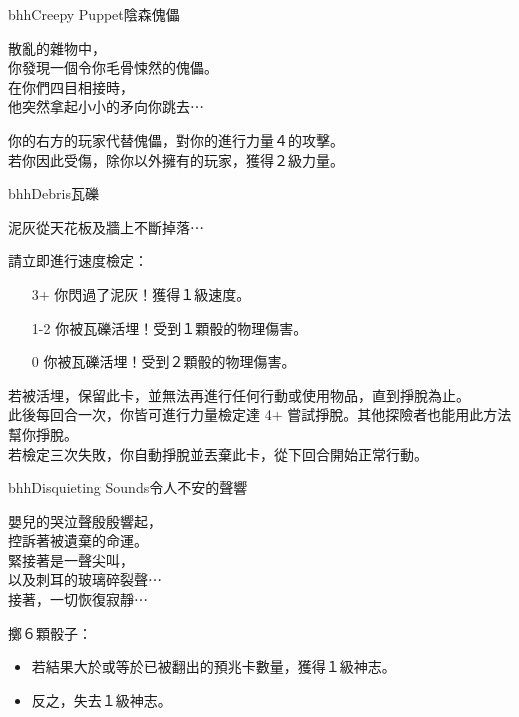 \linebreak[0]%
\begin{EventCard}{bhh}{Creepy Puppet}{陰森傀儡}
  \begin{CardStory}
    散亂的雜物中，\\
    你發現一個令你毛骨悚然的傀儡。\\
    在你們四目相接時，\\
    他突然拿起小小的矛向你跳去⋯
  \end{CardStory}
  你的右方的玩家代替傀儡，對你的進行力量４的攻擊。\\[0.5em]
  若你因此受傷，除你以外擁有的玩家，獲得２級力量。\\[0.5em]
\end{EventCard}%
\linebreak[0]%
\begin{EventCard}{bhh}{Debris}{瓦礫}
  \begin{CardStory}
    泥灰從天花板及牆上不斷掉落⋯
  \end{CardStory}
  請立即進行速度檢定：
  \begin{itemize}
    \item[3+] 你閃過了泥灰！獲得１級速度。
    \item[1-2] 你被瓦礫活埋！受到１顆骰的物理傷害。
    \item[0] 你被瓦礫活埋！受到２顆骰的物理傷害。
  \end{itemize}
  若被活埋，保留此卡，並無法再進行任何行動或使用物品，直到掙脫為止。\\[0.5em]
  此後每回合一次，你皆可進行力量檢定達 4+ 嘗試掙脫。其他探險者也能用此方法幫你掙脫。\\[0.5em]
  若檢定三次失敗，你自動掙脫並丟棄此卡，從下回合開始正常行動。\\[0.5em]
\end{EventCard}%
\linebreak[0]%
\begin{EventCard}{bhh}{Disquieting Sounds}{令人不安的聲響}
  \begin{CardStory}
    嬰兒的哭泣聲殷殷響起，\\
    控訴著被遺棄的命運。\\
    緊接著是一聲尖叫，\\
    以及刺耳的玻璃碎裂聲⋯\\
    接著，一切恢復寂靜⋯
  \end{CardStory}
  擲６顆骰子：
  \begin{itemize}
    \item 若結果大於或等於已被翻出的預兆卡數量，獲得１級神志。
    \item 反之，失去１級神志。
  \end{itemize}
\end{EventCard}%

